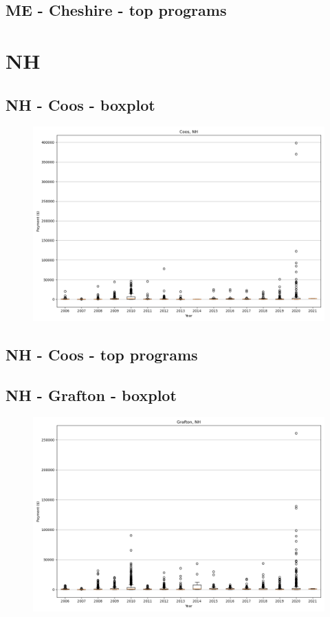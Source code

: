 \subsection*{ME - Cheshire - top programs}

\newpage
\section*{NH}
\subsection*{NH - Coos - boxplot}
\begin{figure}[h]
\centering
\includegraphics[width=7in]{../output/boxplots/counties/Coos-NH_boxplot.png}
\end{figure}


\subsection*{NH - Coos - top programs}

\newpage
\subsection*{NH - Grafton - boxplot}
\begin{figure}[h]
\centering
\includegraphics[width=7in]{../output/boxplots/counties/Grafton-NH_boxplot.png}
\end{figure}



